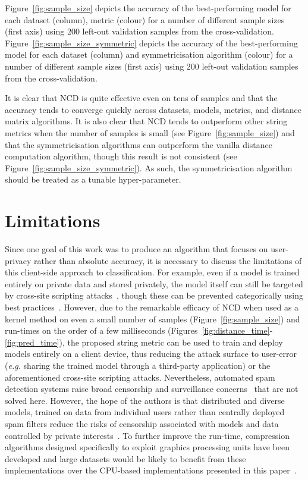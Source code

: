 \documentclass[preprint,12pt]{article}
\begin{document}
Figure~\ref{fig:sample_size} depicts the accuracy of the best-performing model for each dataset (column), metric (colour) for a number of different sample sizes (first axis) using 200 left-out validation samples from the cross-validation.
Figure~\ref{fig:sample_size_symmetric} depicts the accuracy of the best-performing model for each dataset (column) and symmetricisation algorithm (colour) for a number of different sample sizes (first axis) using 200 left-out validation samples from the cross-validation.

It is clear that NCD is quite effective even on tens of samples and that the accuracy tends to converge quickly across datasets, models, metrics, and distance matrix algorithms.
It is also clear that NCD tends to outperform other string metrics when the number of samples is small (see Figure~\ref{fig:sample_size}) and that the symmetricisation algorithms can outperform the vanilla distance computation algorithm, though this result is not consistent (see Figure~\ref{fig:sample_size_symmetric}). 
As such, the symmetricisation algorithm should be treated as a tunable hyper-parameter.







\section{Limitations}
\label{limitations}

Since one goal of this work was to produce an algorithm that focuses on user-privacy rather than absolute accuracy, it is necessary to discuss the limitations of this client-side approach to classification.
For example, even if a model is trained entirely on private data and stored privately, the model itself can still be targeted by cross-site scripting attacks~\cite{}, though these can be prevented categorically using best practices~\cite{}. 
However, due to the remarkable efficacy of NCD when used as a kernel method on even a small number of samples (Figure~\ref{fig:sample_size}) and run-times on the order of a few milliseconds (Figures~\ref{fig:distance_time}-\ref{fig:pred_time}), the proposed string metric can be used to train and deploy models entirely on a client device, thus reducing the attack surface to user-error (\textit{e.g.} sharing the trained model through a third-party application) or the aforementioned cross-site scripting attacks. 
Nevertheless, automated spam detection systems raise broad censorship and surveillance concerns~\cite{chat_control} that are not solved here. 
However, the hope of the authors is that distributed and diverse models, trained on data from individual users rather than centrally deployed spam filters reduce the risks of censorship associated with models and data controlled by private interests~\cite{chat_control}. 
To further improve the run-time, compression algorithms designed specifically to exploit graphics processing units have been developed and large datasets would be likely to benefit from these implementations over the CPU-based implementations presented in this paper~\cite{compression_gpu}. 
\end{document}
